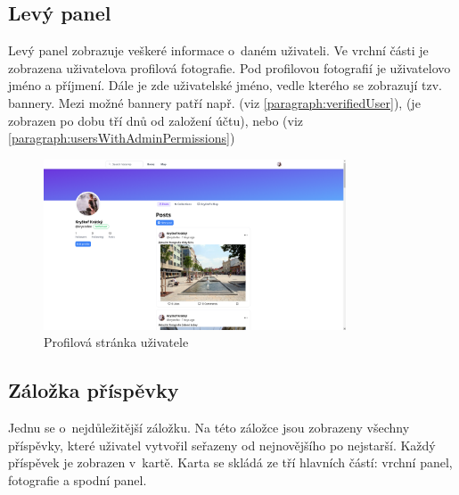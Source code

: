 \documentclass[12pt, a4paper,
  oneside,      %
]{report}
\begin{document}
\subsection{Levý panel}
Levý panel zobrazuje veškeré informace o~daném uživateli. Ve vrchní části je zobrazena uživatelova profilová fotografie. Pod profilovou fotografií je uživatelovo jméno a příjmení. Dále je zde uživatelské jméno, vedle kterého se zobrazují tzv. bannery. Mezi možné bannery patří např.  (viz \ref{paragraph:verifiedUser}),  (je zobrazen po dobu tří dnů od založení účtu), nebo  (viz \ref{paragraph:usersWithAdminPermissions})

\begin{figure}[h]
	\centering
	\includegraphics[width=0.8\textwidth]{images/user_page.png}
	\caption{Profilová stránka uživatele}\label{profilePageScreenshot}
\end{figure}

\subsection{Záložka příspěvky}
Jednu se o~nejdůležitější záložku. Na této záložce jsou zobrazeny všechny příspěvky, které uživatel vytvořil seřazeny od nejnovějšího po nejstarší. Každý příspěvek je zobrazen v~kartě. Karta se skládá ze tří hlavních částí: vrchní panel, fotografie a spodní panel.
\end{document}
